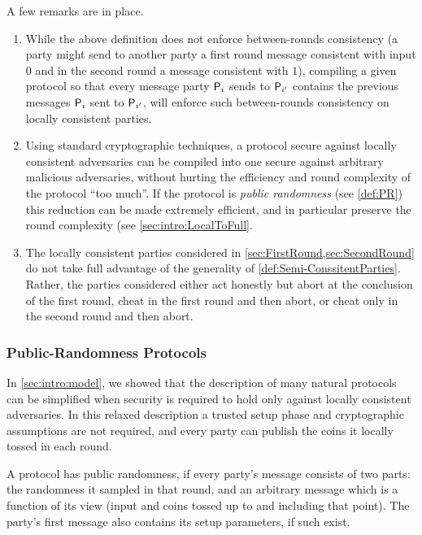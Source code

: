 A few remarks are in place.
\begin{enumerate}
	\item  While the above definition does not enforce between-rounds consistency (a party might send to another party a first round message consistent with input $0$ and in the second round a message consistent with $1$),  compiling a given protocol so that every message party $\mathsf{P}_{i}$ sends to $\mathsf{P}_{i'}$ contains the previous  messages  $\mathsf{P}_{i}$ sent to $\mathsf{P}_{i'}$, will enforce such between-rounds consistency on  locally consistent parties.
	
	\item Using standard cryptographic techniques, a protocol secure against locally consistent adversaries can be compiled into one secure against arbitrary malicious adversaries, without hurting the efficiency and round complexity of the protocol ``too much''.  If the protocol is \emph{public randomness} (see \cref{def:PR}) this reduction can be made extremely efficient, and in particular preserve the round complexity (see \cref{sec:intro:LocalToFull}.
	
	\item The locally consistent parties considered in \cref{sec:FirstRound,sec:SecondRound} do not take full advantage of the generality of \cref{def:Semi-ConssitentParties}. Rather, the parties considered either act honestly but abort at the conclusion of the first round, cheat in the first round and then abort, or cheat only in the second round and then abort.
\end{enumerate}

\subsubsection{Public-Randomness Protocols}\label{sec:OurResults:PR}
In \cref{sec:intro:model}, we showed that the description of many natural protocols can be simplified when security is required to hold only against locally consistent adversaries. In this relaxed description a trusted setup phase and cryptographic assumptions are not required, and every party can publish the coins it locally tossed in each round.

\begin{definition}\label{def:PR}
A protocol has {\sf public randomness}, if every party's message consists of two parts: the randomness it sampled in that round, and an arbitrary message which is a function of its view (input and coins tossed up to and including that point). The party's first message also contains its setup parameters, if such exist.
\end{definition}



